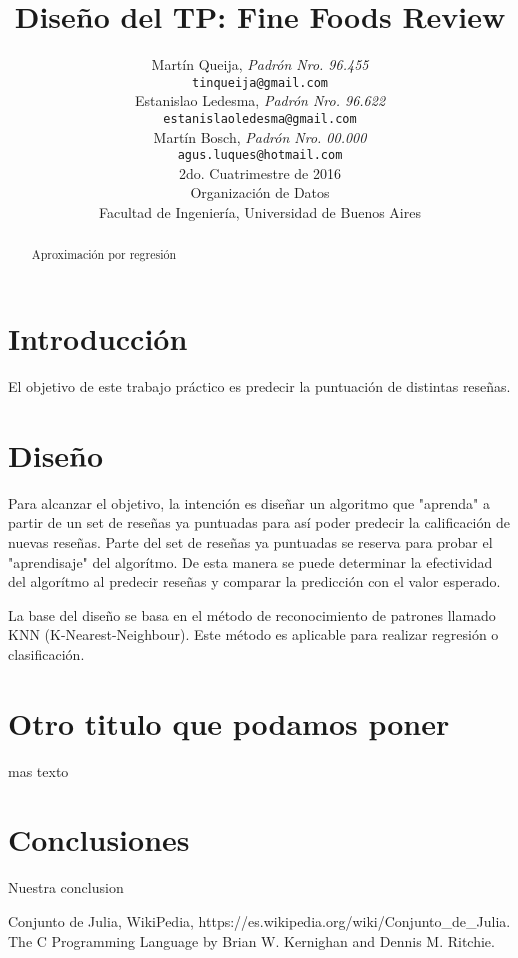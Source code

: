 \documentclass[a4paper,10pt]{article}
\title{		\textbf{Diseño del TP: Fine Foods Review}}
\author{	Martín Queija, \textit{Padrón Nro. 96.455}                     \\
            \texttt{ tinqueija@gmail.com }                                              \\[2.5ex]
            Estanislao Ledesma, \textit{Padrón Nro. 96.622}                     \\
            \texttt{ estanislaoledesma@gmail.com }                                              \\[2.5ex]
            Martín Bosch, \textit{Padrón Nro. 00.000}                     \\
            \texttt{ agus.luques@hotmail.com }                                              \\[2.5ex]
            \normalsize{2do. Cuatrimestre de 2016}                                      \\
            \normalsize{Organización de Datos  }  \\
            \normalsize{Facultad de Ingeniería, Universidad de Buenos Aires}            \\
       }
\date{}
\begin{document}
\maketitle
\thispagestyle{empty}   %


\begin{abstract}
\centerline{Aproximación por regresión}

\end{abstract}
\newpage

\tableofcontents


\section{Introducción}

El objetivo de este trabajo práctico es predecir la puntuación de distintas reseñas.

\section{Diseño}

Para alcanzar el objetivo, la intención es diseñar un algoritmo que "aprenda" a partir de un set de reseñas ya puntuadas para así poder predecir la calificación de nuevas reseñas. Parte del set de reseñas ya puntuadas se reserva para probar el "aprendisaje" del algorítmo. De esta manera se puede determinar la efectividad del algorítmo al predecir reseñas y comparar la predicción con el valor esperado.

La base del diseño se basa en el método de reconocimiento de patrones llamado KNN (K-Nearest-Neighbour). Este método es aplicable para realizar regresión o clasificación. 

\section{Otro titulo que podamos poner}

mas texto

\section{Conclusiones}

Nuestra conclusion

\begin{thebibliography}{99}

 Conjunto de Julia, WikiPedia, https://es.wikipedia.org/wiki/Conjunto\_de\_Julia.
 The C Programming Language by Brian W. Kernighan and Dennis M. Ritchie.

\end{thebibliography}
\end{document}
